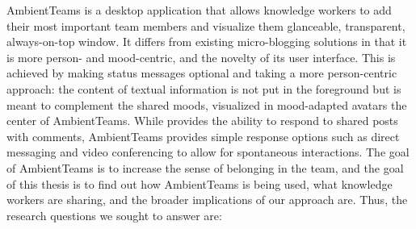 AmbientTeams is a desktop application that allows knowledge workers to add their most important team members and visualize them glanceable, transparent, always-on-top window. It differs from existing micro-blogging solutions in that it is more person- and mood-centric, and the novelty of its user interface. This is achieved by making status messages optional and taking a more person-centric approach: the content of textual information is not put in the foreground but is meant to complement the shared moods, visualized in mood-adapted avatars the center of AmbientTeams. While \textcite{dullemond2013fixing} provides the ability to respond to shared posts with comments, AmbientTeams provides simple response options such as direct messaging and video conferencing to allow for spontaneous interactions. The goal of AmbientTeams is to increase the sense of belonging in the team, and the goal of this thesis is to find out how AmbientTeams is being used, what knowledge workers are sharing, and the broader implications of our approach are. Thus, the research questions we sought to answer are:




